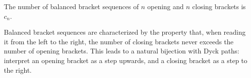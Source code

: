 \begin{page}



\end{page}

\begin{page}
\setcounter{section}{4}
\setcounter{subsection}{5}
\setcounter{dfn}{9}
\label{portion:886}

\begin{cor}
The number of balanced bracket sequences of $n$ opening and $n$ closing brackets is $c_n$.
\end{cor}

\end{page}

\begin{page}
\setcounter{section}{4}
\setcounter{subsection}{6}
\setcounter{dfn}{9}
\label{portion:887}

Balanced bracket sequences are characterized by the property that,
when reading it from the left to the right, the number of closing brackets never exceeds the number of opening brackets.
This leads to a natural bijection with Dyck paths: interpret an opening bracket as a step upwards, and a closing bracket as a step to the right.



\end{page}

